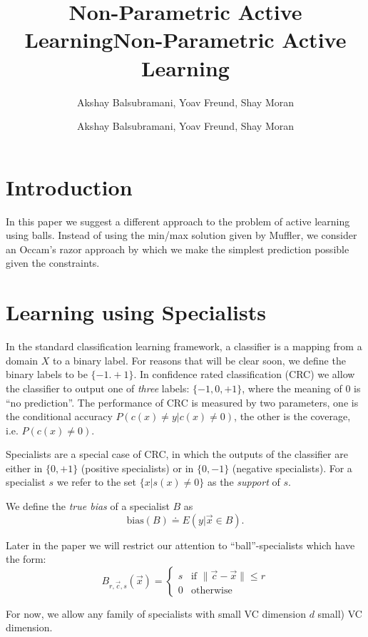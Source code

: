 \documentclass{article}
\title{Non-Parametric Active Learning}
\author{Akshay Balsubramani, Yoav Freund, Shay Moran}
\title{Non-Parametric Active Learning}
\author{Akshay Balsubramani, Yoav Freund, Shay Moran}
\newcommand{\x}{\vec{x}}
\newcommand{\cc}{\vec{c}}
\newcommand{\bias}{\text{bias}}
\begin{document}
\maketitle
\section{Introduction}

In this paper we suggest a different approach to the problem of active
learning using balls. Instead of using the min/max solution given by
Muffler, we consider an Occam's razor approach by which we make the
simplest prediction possible given the constraints.

\section{Learning using Specialists}

In the standard classification learning framework, a classifier is a
mapping from a domain $X$ to a binary label. For reasons that will be
clear soon, we define the binary labels to be $\{-1.+1\}$. In
confidence rated classification (CRC) we allow the classifier to output one
of {\em three} labels: $\{-1,0,+1\}$, where the meaning of $0$ is ``no
prediction''. The performance of CRC is measured by two parameters,
one is the conditional accuracy $P(c(x) \neq y | c(x) \neq 0)$, the other
is the coverage, i.e. $P(c(x) \neq 0)$.

Specialists are a special case of CRC, in which the outputs of the
classifier are either in $\{0,+1\}$ (positive specialists) or in
$\{0,-1\}$ (negative specialists). For a specialist $s$ we refer to
the set $\{x|s(x)\neq 0\}$ as the {\em support} of $s$.

We define the {\em true bias} of a specialist $B$ as
\[
  \bias(B) \doteq E\left( y|\x \in B \right).
\]


\iffalse
Later in the paper we will restrict our attention to
``ball''-specialists which have the form:
    \[
    B_{r,\cc,s}(\x) =
    \begin{cases}
      s & \text{if } \| \cc- \x \| \leq r \\
    0 & \text{otherwise }
    \end{cases}
    \]

For now, we allow any family of specialists with small VC dimension $d$
small) VC dimension.
\end{document}
